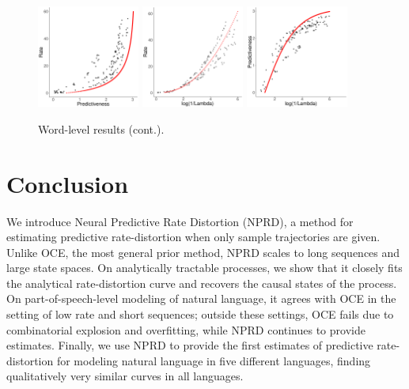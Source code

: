 \documentclass[entropy,article,submit,moreauthors,pdftex,10pt,a4paper]{Definitions/mdpi}
\begin{document}
\begin{figure}
\begin{center}
		\includegraphics[width=0.3\textwidth]{code/figures/LDC2012T05-words-info-fitted.pdf}
\includegraphics[width=0.3\textwidth]{code/figures/LDC2012T05-words-nlogbeta-mem-fitted.pdf}
\includegraphics[width=0.3\textwidth]{code/figures/LDC2012T05-words-nlogbeta-ee-fitted.pdf}
	\end{center}
	\caption{Word-level results (cont.).}\label{fig:wordlevel-fit-2}
\end{figure}






\section{Conclusion}
We introduce Neural Predictive Rate Distortion (NPRD), a method for estimating predictive rate-distortion when only sample trajectories are given.
Unlike OCE, the most general prior method, NPRD scales to long sequences and large state spaces.
On analytically tractable processes, we show that it closely fits the analytical rate-distortion curve and recovers the causal states of the process.
On part-of-speech-level modeling of natural language, it agrees with OCE in the setting of low rate and short sequences; outside these settings, OCE fails due to combinatorial explosion and overfitting, while NPRD continues to provide estimates.
Finally, we use NPRD to provide the first estimates of predictive rate-distortion for modeling natural language in five different languages, finding qualitatively very similar curves in all languages.
\end{document}
